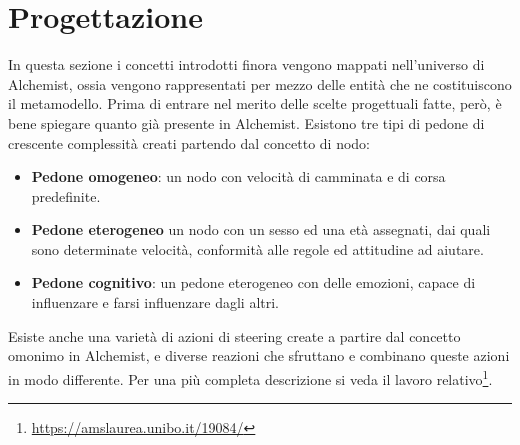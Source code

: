 \documentclass[12pt,a4paper,openright,oneside]{book}
\begin{document}
\section{Progettazione}
In questa sezione i concetti introdotti finora vengono mappati nell'universo di Alchemist, ossia vengono rappresentati per mezzo delle entità che ne costituiscono il metamodello. Prima di entrare nel merito delle scelte progettuali fatte, però, è bene spiegare quanto già presente in Alchemist. Esistono tre tipi di pedone di crescente complessità creati partendo dal concetto di nodo:
\begin{itemize}
    \item \textbf{Pedone omogeneo}: un nodo con velocità di camminata e di corsa predefinite.
    \item \textbf{Pedone eterogeneo} un nodo con un sesso ed una età assegnati, dai quali sono determinate velocità, conformità alle regole ed attitudine ad aiutare.
    \item \textbf{Pedone cognitivo}: un pedone eterogeneo con delle emozioni, capace di influenzare e farsi influenzare dagli altri.
\end{itemize}
Esiste anche una varietà di azioni di steering create a partire dal concetto omonimo in Alchemist, e diverse reazioni che sfruttano e combinano queste azioni in modo differente. Per una più completa descrizione si veda il lavoro relativo\footnote{\url{https://amslaurea.unibo.it/19084/}}. 
\end{document}
